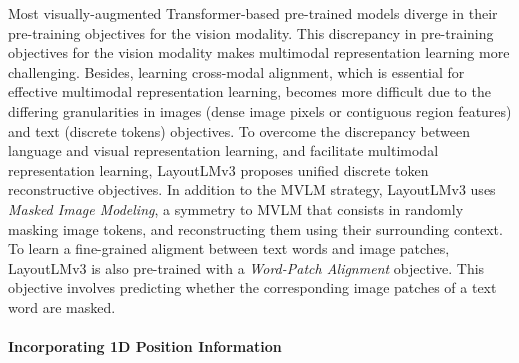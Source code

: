 Most visually-augmented Transformer-based pre-trained models diverge in their pre-training objectives for the vision modality. This discrepancy in pre-training objectives for the vision modality makes multimodal representation learning more challenging. Besides, learning cross-modal alignment, which is essential for effective multimodal representation learning, becomes more difficult due to the differing granularities in images (dense image pixels or contiguous region features) and text (discrete tokens) objectives. To overcome the discrepancy between language and visual representation learning, and facilitate multimodal representation learning, LayoutLMv3 \citep{huang2022layoutlmv3} proposes unified discrete token reconstructive objectives. In addition to the \ac{MVLM} strategy, LayoutLMv3 uses \textit{Masked Image Modeling}, a symmetry to \ac{MVLM} that consists in randomly masking image tokens, and reconstructing them using their surrounding context. To learn a fine-grained aligment between text words and image patches, LayoutLMv3 is also pre-trained with a \textit{Word-Patch Alignment} objective. This objective involves predicting whether the corresponding image patches of a text word are masked. 


\paragraph{Incorporating 1D Position Information}


